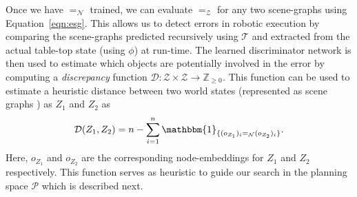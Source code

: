 Once we have $=_\mathcal{N}$ trained, we can evaluate $=_\mathcal{Z}$ for any two scene-graphs using Equation~\ref{eqn:esg}. This allows us to detect errors in robotic execution by comparing the scene-graphs predicted recursively using $\mathcal{T}$ and extracted from the actual table-top state (using $\phi$) at run-time. 
%
The learned discriminator network is then used to estimate which objects are potentially involved in the error by computing a  \emph{discrepancy} function $\mathcal{D}: \mathcal{Z} \times \mathcal{Z} \rightarrow \mathbb{Z}_{\geq 0}$\textit{.} 
%
This function can be used to estimate a heuristic distance between two world states (represented as scene graphs ) as $Z_1$ and $Z_2$ as   
%
\begin{equation}
    \mathcal{D}(Z_1, Z_2) =  n - \sum_{i = 1}^{n} \mathbbm{1}_{\{(o_{Z_1})_i =_\mathcal{N} (o_{Z_2})_i\}}.
\end{equation}
%
Here, $o_{Z_1}$ and $o_{Z_2}$ are the corresponding node-embeddings for $Z_1$ and $Z_2$ respectively. 
%
This function serves as heuristic to guide our search in the planning space $\mathcal{P}$ which is described next.

